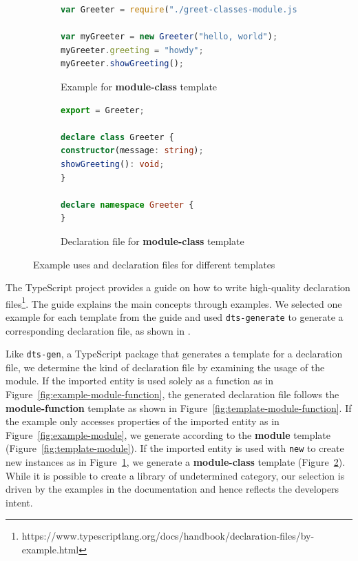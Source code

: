 \documentclass[sigconf]{acmart}
\begin{document}
\begin{figure}[t]
  \begin{subfigure}[t]{0.48\linewidth}
    \begin{lstlisting}[language=JavaScript,numbers=none]
var Greeter = require("./greet-classes-module.js");

var myGreeter = new Greeter("hello, world");
myGreeter.greeting = "howdy";
myGreeter.showGreeting();
    \end{lstlisting}
    \caption{Example for \textbf{module-class} template}
    \label{fig:example-class}
  \end{subfigure}
  \hfill
  \begin{subfigure}[t]{0.48\linewidth}
    \begin{lstlisting}[language=TypeScript,numbers=none]
export = Greeter;

declare class Greeter {
constructor(message: string);
showGreeting(): void;
}

declare namespace Greeter {
}
    \end{lstlisting}
    \caption{Declaration file for \textbf{module-class} template}
    \label{fig:template-class}
  \end{subfigure}

\caption{Example uses and declaration files for different templates}
\label{fig:typescript-templates-by-example}
\end{figure}

The TypeScript project provides a guide on how to write high-quality declaration
files\footnote{https://www.typescriptlang.org/docs/handbook/declaration-files/by-example.html}. The guide
explains the main concepts through examples. We selected one example for each template
from the guide and
used \texttt{dts-generate} to generate a corresponding declaration file, as shown in
.

Like \texttt{dts-gen}, a TypeScript package that generates a template for a declaration
file, we determine the kind of declaration file by examining the usage
of the module. If the
imported entity is used solely as a function as in Figure~\ref{fig:example-module-function}, the
generated declaration file follows the \textbf{module-function} template as shown in Figure~\ref{fig:template-module-function}.
If the example only accesses properties of the imported entity as in
Figure~\ref{fig:example-module}, we generate according to the \textbf{module} template (Figure~\ref{fig:template-module}).
If the imported entity is used with \lstinline/new/ to create new instances as in
Figure~\ref{fig:example-class}, we generate a \textbf{module-class} template (Figure~\ref{fig:template-class}).
While it is possible to create a library of undetermined category, our selection is driven
by the examples in the documentation and 
hence reflects the developers intent.
\end{document}
